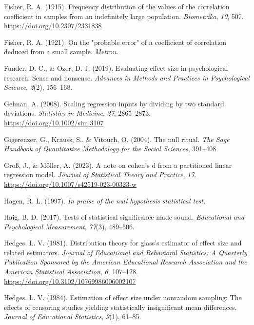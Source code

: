 \documentclass[
  man,floatsintext]{apa7}
\newlength{\cslhangindent}
\newlength{\cslentryspacingunit} %
\newenvironment{CSLReferences}[2] %
 {%
  \setlength{\parindent}{0pt}
  \ifodd #1
  \let\oldpar\par
  \def\par{\hangindent=\cslhangindent\oldpar}
  \fi
  \setlength{\parskip}{#2\cslentryspacingunit}
 }%
 {}
\begin{document}
\begin{CSLReferences}{1}{0}
\leavevmode{}%
Fisher, R. A. (1915). Frequency distribution of the values of the correlation coefficient in samples from an indefinitely large population. \emph{Biometrika}, \emph{10}, 507. \url{https://doi.org/10.2307/2331838}

\leavevmode{}%
Fisher, R. A. (1921). On the "probable error" of a coefficient of correlation deduced from a small sample. \emph{Metron}.

\leavevmode{}%
Funder, D. C., \& Ozer, D. J. (2019). Evaluating effect size in psychological research: Sense and nonsense. \emph{Advances in Methods and Practices in Psychological Science}, \emph{2}(2), 156--168.

\leavevmode{}%
Gelman, A. (2008). Scaling regression inputs by dividing by two standard deviations. \emph{Statistics in Medicine}, \emph{27}, 2865--2873. \url{https://doi.org/10.1002/sim.3107}

\leavevmode{}%
Gigerenzer, G., Krauss, S., \& Vitouch, O. (2004). The null ritual. \emph{The Sage Handbook of Quantitative Methodology for the Social Sciences}, 391--408.

\leavevmode{}%
Groß, J., \& Möller, A. (2023). A note on cohen's d from a partitioned linear regression model. \emph{Journal of Statistical Theory and Practice}, \emph{17}. \url{https://doi.org/10.1007/s42519-023-00323-w}

\leavevmode{}%
Hagen, R. L. (1997). \emph{In praise of the null hypothesis statistical test.}

\leavevmode{}%
Haig, B. D. (2017). Tests of statistical significance made sound. \emph{Educational and Psychological Measurement}, \emph{77}(3), 489--506.

\leavevmode{}%
Hedges, L. V. (1981). Distribution theory for glass's estimator of effect size and related estimators. \emph{Journal of Educational and Behavioral Statistics: A Quarterly Publication Sponsored by the American Educational Research Association and the American Statistical Association}, \emph{6}, 107--128. \url{https://doi.org/10.3102/10769986006002107}

\leavevmode{}%
Hedges, L. V. (1984). Estimation of effect size under nonrandom sampling: The effects of censoring studies yielding statistically insignificant mean differences. \emph{Journal of Educational Statistics}, \emph{9}(1), 61--85.


\end{CSLReferences}
\end{document}
